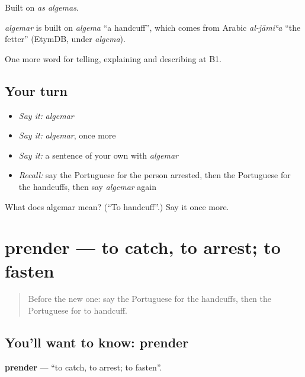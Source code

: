 Built on \emph{as algemas}.

\begin{cousinweb}
\emph{algemar} is built on \emph{algema} \textquotedblleft{}a handcuff\textquotedblright{}, which comes from Arabic \emph{al-jāmiʿa} \textquotedblleft{}the fetter\textquotedblright{} (EtymDB, under \emph{algema}).
\end{cousinweb}

\begin{grammarlens}[title={What you've built}]
One more word for telling, explaining and describing at B1.
\end{grammarlens}

\subsection*{Your turn}
\begin{itemize}
\raggedright
  \item \emph{Say it:} \emph{algemar}
  \item \emph{Say it:} \emph{algemar}, once more
  \item \emph{Say it:} a sentence of your own with \emph{algemar}
  \item \emph{Recall:} say the Portuguese for the person arrested, then the Portuguese for the handcuffs, then say \emph{algemar} again
\end{itemize}

\begin{tcolorbox}[breakable,colback=teal!4,colframe=teal!35!black,title={Before you move on}]
What does algemar mean? (\textquotedblleft{}To handcuff\textquotedblright{}.) Say it once more.
\end{tcolorbox}
\section[prender]{prender — to catch, to arrest; to fasten}

\label{lesson:PT-C296-prender}



\begin{quote}
Before the new one: say the Portuguese for the handcuffs, then the Portuguese for to handcuff.
\end{quote}

\subsection*{You'll want to know: prender}
\textbf{prender} — \textquotedblleft{}to catch, to arrest; to fasten\textquotedblright{}.

